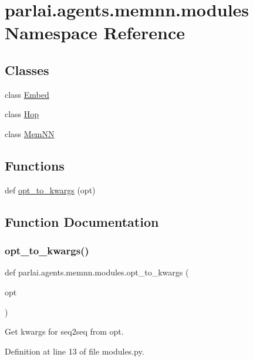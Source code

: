 \hypertarget{namespaceparlai_1_1agents_1_1memnn_1_1modules}{}\section{parlai.\+agents.\+memnn.\+modules Namespace Reference}
\label{namespaceparlai_1_1agents_1_1memnn_1_1modules}
\subsection*{Classes}
\begin{DoxyCompactItemize}
\item 
class \hyperlink{classparlai_1_1agents_1_1memnn_1_1modules_1_1Embed}{Embed}
\item 
class \hyperlink{classparlai_1_1agents_1_1memnn_1_1modules_1_1Hop}{Hop}
\item 
class \hyperlink{classparlai_1_1agents_1_1memnn_1_1modules_1_1MemNN}{Mem\+NN}
\end{DoxyCompactItemize}
\subsection*{Functions}
\begin{DoxyCompactItemize}
\item 
def \hyperlink{namespaceparlai_1_1agents_1_1memnn_1_1modules_a2c4bbfc9a0eb3220cd85bb8dd94b147c}{opt\+\_\+to\+\_\+kwargs} (opt)
\end{DoxyCompactItemize}


\subsection{Function Documentation}
\mbox{\label{namespaceparlai_1_1agents_1_1memnn_1_1modules_a2c4bbfc9a0eb3220cd85bb8dd94b147c}} 
\subsubsection{\texorpdfstring{opt\+\_\+to\+\_\+kwargs()}{opt\_to\_kwargs()}}
{\footnotesize\ttfamily def parlai.\+agents.\+memnn.\+modules.\+opt\+\_\+to\+\_\+kwargs (\begin{DoxyParamCaption}\item[{}]{opt }\end{DoxyParamCaption})}

\begin{DoxyVerb}Get kwargs for seq2seq from opt.\end{DoxyVerb}
 

Definition at line 13 of file modules.\+py.

